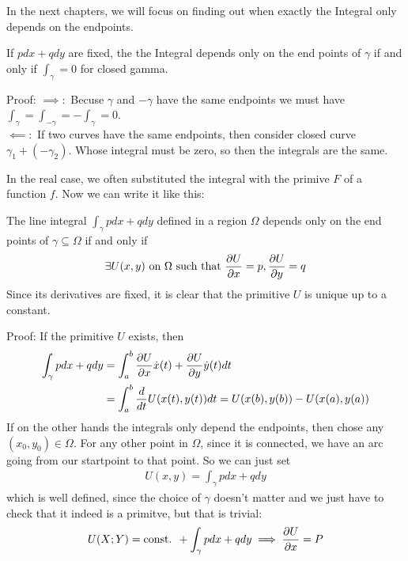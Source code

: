In the next chapters, we will focus on finding out when exactly the Integral only depends on the endpoints.

If $pdx + qdy$ are fixed, the the Integral depends only on the end points of $\gamma$ if and only if $\int_{\gamma} = 0$ for closed gamma.

Proof: $\implies:$ Becuse $\gamma$ and $-\gamma$ have the same endpoints we must have $\int_{\gamma} = \int_{-\gamma} = - \int_{\gamma} = 0$.\\
$\impliedby:$ If two curves have the same endpoints, then consider closed curve $\gamma_1 + (- \gamma_2)$. Whose integral must be zero, so then the integrals are the same.

In the real case, we often substituted the integral with the primive $F$ of a function $f$. Now we can write it like this:

\begin{theorem}[]
 The line integral $\int_{\gamma} pdx + qdy$ defined in a region $\Omega$ depends only on the end points of $\gamma \subseteq \Omega$ if and only if
 \begin{align*}
	 \exists U(x,y) \text{ on } \Omega \text{ such that } \frac{\partial U}{\partial x} = p, \frac{\partial U}{\partial y} = q 
 \end{align*}
 Since its derivatives are fixed, it is clear that the primitive $U$ is unique up to a constant.
\end{theorem}
Proof: If the primitive $U$ exists, then
\begin{align*}
	\int_{\gamma} pdx + qdy &= \int_{a}^{b} \frac{\partial U}{\partial x}\dot{x}(t) + \frac{\partial U}{\partial y} \dot{y}(t) dt\\
													&= \int_{a}^{b} \frac{d}{dt} U(x(t), y(t)) dt = U(x(b), y(b)) - U(x(a),y(a))
\end{align*}
If on the other hands the integrals only depend the endpoints, then chose any $(x_0,y_0) \in \Omega$. For any other point in $\Omega$, since it is connected, we have an arc going from our startpoint to that point. So we can just set
\begin{align*}
	U(x,y) = \int_{\gamma} pdx + qdy
\end{align*}
which is well defined, since the choice of $\gamma$ doesn't matter and we just have to check that it indeed is a primitve, but that is trivial:
\begin{align*}
	U(X;Y) = \text{const. } + \int_{\gamma} pdx + q dy \implies \frac{\partial U}{\partial x} = P
\end{align*}


